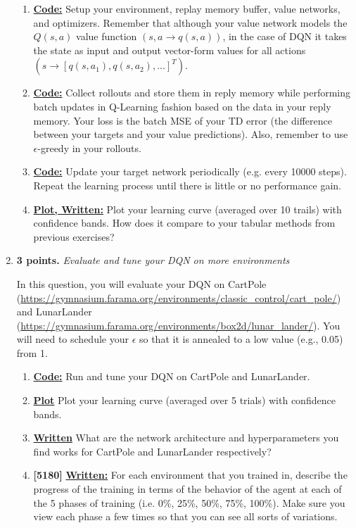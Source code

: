 \documentclass{article}
\begin{document}
\begin{enumerate}
\begin{enumerate}
	\item \uline{\textbf{Code:}} Setup your environment, replay memory buffer, value networks, and optimizers. Remember that although your value network models the $Q(s,a)$ value function $(s,a\rightarrow q(s,a))$, in the case of DQN it takes the state as input and output vector-form values for all actions $(s \rightarrow [q(s,a_1),q(s,a_2),...]^T)$.  
	\item \uline{\textbf{Code:}} Collect rollouts and store them in reply memory while performing batch updates in Q-Learning fashion based on the data in your reply memory. Your loss is the batch MSE of your TD error (the difference between your targets and your value predictions). Also, remember to use $\epsilon$-greedy in your rollouts.
	\item \uline{\textbf{Code:}} Update your target network periodically (e.g. every 10000 steps). Repeat the learning process until there is little or no performance gain.
	\item \uline{\textbf{Plot, Written:}} Plot your learning curve (averaged over 10 trails) with confidence bands. How does it compare to your tabular methods from previous exercises?
\end{enumerate}

\item \textbf{3 points.} \textit{Evaluate and tune your DQN on more environments}

In this question, you will evaluate your DQN on CartPole (\url{https://gymnasium.farama.org/environments/classic_control/cart_pole/}) and LunarLander (\url{https://gymnasium.farama.org/environments/box2d/lunar_lander/}). You will need to schedule your $\epsilon$ so that it is annealed to a low value (e.g., 0.05) from 1.

\begin{enumerate}
	\item \uline{\textbf{Code:}} Run and tune your DQN on CartPole and LunarLander.
	\item \uline{\textbf{Plot}} Plot your learning curve (averaged over 5 trials) with confidence bands.
	\item \uline{\textbf{Written}} What are the network architecture and hyperparameters you find works for CartPole and LunarLander respectively?
	\item \textbf{[5180]} \uline{\textbf{Written:}} For each environment that you trained in, describe the progress of the training in terms of the behavior of the agent at each of the 5 phases of training (i.e. 0\%, 25\%, 50\%, 75\%, 100\%). Make sure you view each phase a few times so that you can see all sorts of variations.
 

\end{enumerate}
\end{enumerate}
\end{document}
